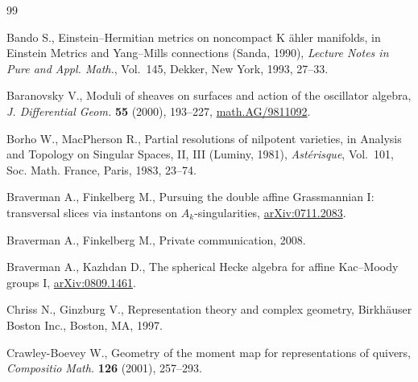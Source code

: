 \documentclass[10pt,a4paper]{amsart}
\theoremstyle{definition}
\numberwithin{equation}{section}
\begin{document}
\begin{thebibliography}{99}


\footnotesize\itemsep=0pt

Bando S.,  Einstein--Hermitian metrics on noncompact  K \"ahler
  manifolds, in Einstein Metrics and Yang--Mills connections (Sanda, 1990),
 {\it  Lecture Notes in Pure and Appl. Math.}, Vol.~145, Dekker, New York, 1993,
27--33. %

Baranovsky V.,  Moduli of sheaves on surfaces and action of the oscillator
  algebra, {\it J. Differential Geom.} \textbf{55} (2000),  193--227, \href{http://arxiv.org/abs/math.AG/9811092}{math.AG/9811092}.

Borho W., MacPherson R.,  Partial resolutions of nilpotent varieties,
  in Analysis and Topology on Singular Spaces, II, III (Luminy, 1981),
 {\it  Ast\'erisque}, Vol.~101, Soc. Math. France, Paris, 1983,  23--74.

Braverman A., Finkelberg M.,  Pursuing the double af\/f\/ine {G}rassmannian
  {I}: transversal slices via instantons on ${A}_k$-singularities, \href{http://arxiv.org/abs/0711.2083}{arXiv:0711.2083}.

Braverman A., Finkelberg M., Private communication, 2008.

Braverman A., Kazhdan D., The spherical {H}ecke algebra for af\/f\/ine
  {K}ac--{M}oody groups {I}, \href{http://arxiv.org/abs/0809.1461}{arXiv:0809.1461}.

Chriss N., Ginzburg V.,  Representation theory and complex geometry,
  Birkh\"auser Boston Inc., Boston, MA, 1997. %

Crawley-Boevey W., Geometry of the moment map for representations of
  quivers, {\it Compositio Math.} \textbf{126} (2001),   257--293.


\end{thebibliography}
\end{document}

